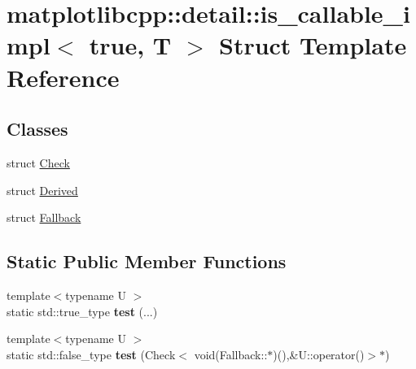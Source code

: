 \hypertarget{structmatplotlibcpp_1_1detail_1_1is__callable__impl_3_01true_00_01T_01_4}{}\section{matplotlibcpp\+:\+:detail\+:\+:is\+\_\+callable\+\_\+impl$<$ true, T $>$ Struct Template Reference}
\label{structmatplotlibcpp_1_1detail_1_1is__callable__impl_3_01true_00_01T_01_4}
\subsection*{Classes}
\begin{DoxyCompactItemize}
\item 
struct \hyperlink{structmatplotlibcpp_1_1detail_1_1is__callable__impl_3_01true_00_01T_01_4_1_1Check}{Check}
\item 
struct \hyperlink{structmatplotlibcpp_1_1detail_1_1is__callable__impl_3_01true_00_01T_01_4_1_1Derived}{Derived}
\item 
struct \hyperlink{structmatplotlibcpp_1_1detail_1_1is__callable__impl_3_01true_00_01T_01_4_1_1Fallback}{Fallback}
\end{DoxyCompactItemize}
\subsection*{Static Public Member Functions}
\begin{DoxyCompactItemize}
\item 
{\footnotesize template$<$typename U $>$ }\\static std\+::true\+\_\+type {\bfseries test} (...)\hypertarget{structmatplotlibcpp_1_1detail_1_1is__callable__impl_3_01true_00_01T_01_4_a0a9fd9d26d8d3cb932a4186a17a54026}{}\label{structmatplotlibcpp_1_1detail_1_1is__callable__impl_3_01true_00_01T_01_4_a0a9fd9d26d8d3cb932a4186a17a54026}

\item 
{\footnotesize template$<$typename U $>$ }\\static std\+::false\+\_\+type {\bfseries test} (Check$<$ void(Fallback\+::$\ast$)(),\&U\+::operator()$>$$\ast$)\hypertarget{structmatplotlibcpp_1_1detail_1_1is__callable__impl_3_01true_00_01T_01_4_abf810ecef316f35db92e472508f643ce}{}\label{structmatplotlibcpp_1_1detail_1_1is__callable__impl_3_01true_00_01T_01_4_abf810ecef316f35db92e472508f643ce}

\end{DoxyCompactItemize}
